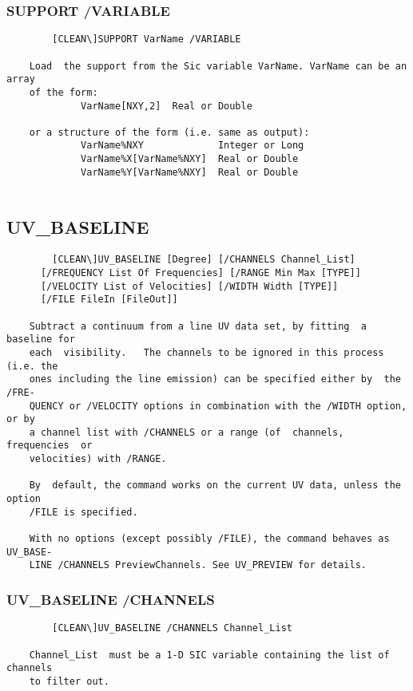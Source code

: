 \subsubsection{SUPPORT /VARIABLE}
\begin{verbatim}
        [CLEAN\]SUPPORT VarName /VARIABLE

    Load  the support from the Sic variable VarName. VarName can be an array
    of the form:
             VarName[NXY,2]  Real or Double

    or a structure of the form (i.e. same as output):
             VarName%NXY             Integer or Long
             VarName%X[VarName%NXY]  Real or Double
             VarName%Y[VarName%NXY]  Real or Double


\end{verbatim}
\subsection{UV\_BASELINE}
\begin{verbatim}
        [CLEAN\]UV_BASELINE [Degree] [/CHANNELS Channel_List]
      [/FREQUENCY List Of Frequencies] [/RANGE Min Max [TYPE]]
      [/VELOCITY List of Velocities] [/WIDTH Width [TYPE]]
      [/FILE FileIn [FileOut]]

    Subtract a continuum from a line UV data set, by fitting  a baseline for
    each  visibility.   The channels to be ignored in this process (i.e. the
    ones including the line emission) can be specified either by  the  /FRE-
    QUENCY or /VELOCITY options in combination with the /WIDTH option, or by
    a channel list with /CHANNELS or a range (of  channels,  frequencies  or
    velocities) with /RANGE.

    By  default, the command works on the current UV data, unless the option
    /FILE is specified.

    With no options (except possibly /FILE), the command behaves as UV_BASE-
    LINE /CHANNELS PreviewChannels. See UV_PREVIEW for details.

\end{verbatim}
\subsubsection{UV\_BASELINE /CHANNELS}
\begin{verbatim}
        [CLEAN\]UV_BASELINE /CHANNELS Channel_List

    Channel_List  must be a 1-D SIC variable containing the list of channels
    to filter out.

\end{verbatim}

